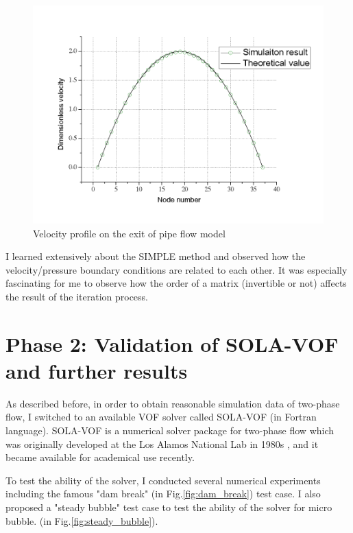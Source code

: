 \documentclass[a4,14pt]{extarticle}
\begin{document}
\begin{figure}[h!]
  \centering
  \includegraphics[width=12cm]{h-g_flow_result.png}
  \caption{Velocity profile on the exit of pipe flow model}
  \label{fig:h-g_result}
\end{figure}

I learned extensively about the SIMPLE method and observed how the velocity/pressure 
boundary conditions are related to each other. It was especially fascinating for me to observe
how the order of a matrix (invertible or not) affects the result of the iteration process.


\section{Phase 2: Validation of SOLA-VOF and further results}

As described before, in order to obtain reasonable simulation data of two-phase flow, I switched
to an available VOF solver called SOLA-VOF (in Fortran language).
SOLA-VOF is a numerical solver package for two-phase flow which was originally
developed at the Los Alamos National Lab in 1980s \cite{nichols1980sola}, and it became available
for academical use recently.

To test the ability of the solver, I conducted several numerical experiments including the
famous "dam break" (in Fig.\ref{fig:dam_break}) test case.
I also proposed a "steady bubble" test case to test the ability of the solver for micro bubble.
(in Fig.\ref{fig:steady_bubble}). 
\end{document}

